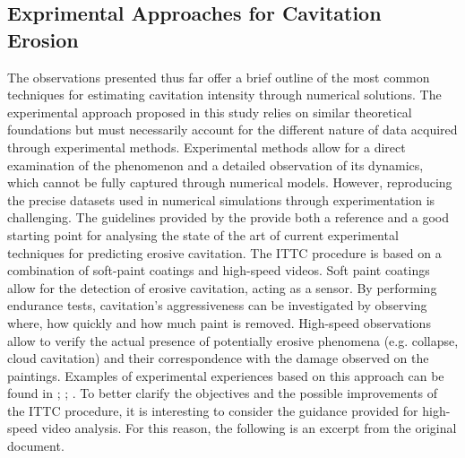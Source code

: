 \subsection{Exprimental Approaches for Cavitation Erosion}

The observations presented thus far offer a brief outline of the most common techniques for estimating cavitation intensity through numerical solutions. The experimental approach proposed in this study relies on similar theoretical foundations but must necessarily account for the different nature of data acquired through experimental methods.
Experimental methods allow for a direct examination of the phenomenon and a detailed observation of its dynamics, which cannot be fully captured through numerical models. However, reproducing the precise datasets used in numerical simulations through experimentation is challenging.
The guidelines provided by the \cite{ITTC_Erosion} provide both a reference and a good starting point for analysing the state of the art of current experimental techniques for predicting erosive cavitation.
The ITTC procedure is based on a combination of soft-paint coatings and high-speed videos.
Soft paint coatings allow for the detection of erosive cavitation, acting as a sensor.  By performing endurance tests, cavitation's aggressiveness can be investigated by observing where, how quickly and how much paint is removed.
High-speed observations allow to verify the actual presence of potentially erosive phenomena (e.g. collapse, cloud cavitation) and their correspondence with the damage observed on the paintings. 
Examples of experimental experiences based on this approach can be found in \cite{Mantzaris2015}; \cite{Pfitsch2009}; \cite{Abbasi2024}.
To better clarify the objectives and the possible improvements of the ITTC procedure, it is interesting to consider the guidance provided for high-speed video analysis. For this reason, the following is an excerpt from the original document.

